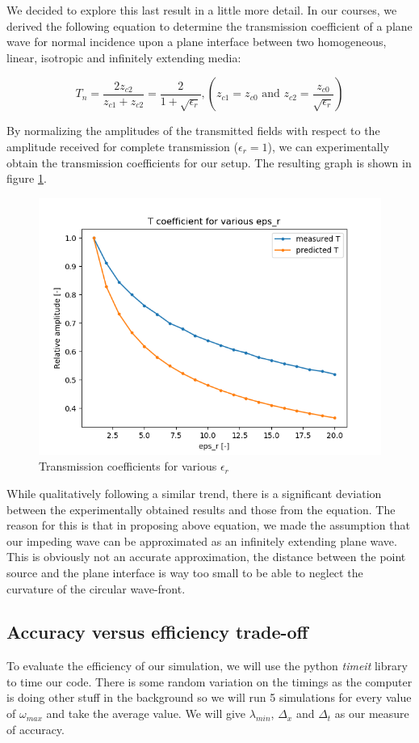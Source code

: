 \documentclass[11pt, a4paper]{article}
\begin{document}
We decided to explore this last result in a little more detail. In our courses, we derived the following equation to determine the transmission coefficient of a plane wave for normal incidence upon a plane interface between two homogeneous, linear, isotropic and infinitely extending media:

\begin{equation}
    T_n = \frac{2z_{c2}}{z_{c1}+z_{c2}} = \frac{2}{1+\sqrt{\epsilon_r}},  (z_{c1}=z_{c0} \text{ and } z_{c2}=\frac{z_{c0}}{\sqrt{\epsilon_r}})
\end{equation}

By normalizing the amplitudes of the transmitted fields with respect to the amplitude received for complete transmission ($\epsilon_r = 1$), we can experimentally obtain the transmission coefficients for our setup. The resulting graph is shown in figure \ref{T_coefficients}.

\begin{figure}[H]
    \centering
    \includegraphics[width=0.75\linewidth]{transmission/TRcoeff_eps_r.png}
    \caption{Transmission coefficients for various $\epsilon_r$}
    \label{T_coefficients}
\end{figure}

While qualitatively following a similar trend, there is a significant deviation between the experimentally obtained results and those from the equation. The reason for this is that in proposing above equation, we made the assumption that our impeding wave can be approximated as an infinitely extending plane wave. This is obviously not an accurate approximation, the distance between the point source and the plane interface is way too small to be able to neglect the curvature of the circular wave-front. 

\subsection{Accuracy versus efficiency trade-off} %
To evaluate the efficiency of our simulation, we will use the python \emph{timeit} library to time our code. There is some random variation on the timings as the computer is doing other stuff in the background so we will run 5 simulations for every value of $\omega_{max}$ and take the average value. We will give $\lambda_{min}$, $\Delta_x$ and $\Delta_t$ as our measure of accuracy.
\end{document}
